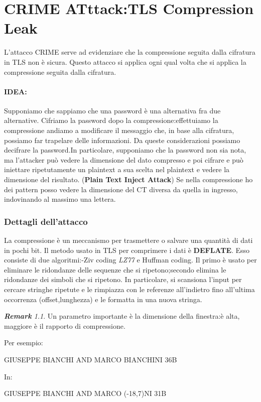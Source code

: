 \documentclass{book}
\theoremstyle{remark}
\newtheorem*{remark}{\textbf{Remark}}
\begin{document}
\chapter{CRIME ATttack:TLS Compression Leak}
L'attacco CRIME serve ad evidenziare che la compressione seguita dalla cifratura in TLS non è sicura\@. Questo attacco si applica ogni qual volta che si applica la compressione seguita dalla cifratura\@.
\subsubsection{IDEA:}Supponiamo che sappiamo che una password è una alternativa fra due alternative\@. Cifriamo la password dopo la compressione:\@quando effettuiamo la compressione andiamo a modificare il messaggio che, in base alla cifratura, possiamo far trapelare delle informazioni\@. Da queste considerazioni possiamo decifrare la password\@.\newline In particolare, supponiamo che la password non sia nota, ma l'attacker può vedere la dimensione del dato compresso e poi cifrare e può iniettare ripetutamente un plaintext a sua scelta nel plaintext e vedere la dimensione del risultato\@. (\textbf{Plain Text Inject Attack}) Se nella compressione ho dei pattern posso vedere la dimensione del CT diversa da quella in ingresso, indovinando al massimo una lettera\@.\newline
\subsection{Dettagli dell'attacco}
La compressione è un meccanismo per trasmettere o salvare una quantità di dati in pochi bit\@. Il metodo usato in TLS per comprimere i dati è \textbf{DEFLATE}\@. Esso consiste di due algoritmi:\@Lempel-Ziv coding \emph{LZ77} e Huffman coding\@. Il primo è usato per eliminare le ridondanze delle sequenze che si ripetono;\@il secondo elimina le ridondanze dei simboli che si ripetono\@. In particolare, si scansiona l'input per cercare stringhe ripetute e le rimpiazza con le referenze all'indietro fino all'ultima occorrenza (offset,lunghezza) e le formatta in una nuova stringa\@.
\begin{remark}
	Un parametro importante è la dimensione della finestra: è alta, maggiore è il rapporto di compressione\@.
\end{remark} Per esempio:\begin{center}
	GIUSEPPE BIANCHI AND MARCO BIANCHINI   36B
\end{center}
In:\begin{center}
	GIUSEPPE BIANCHI AND MARCO (-18,7)NI   31B
\end{center}
\end{document}
